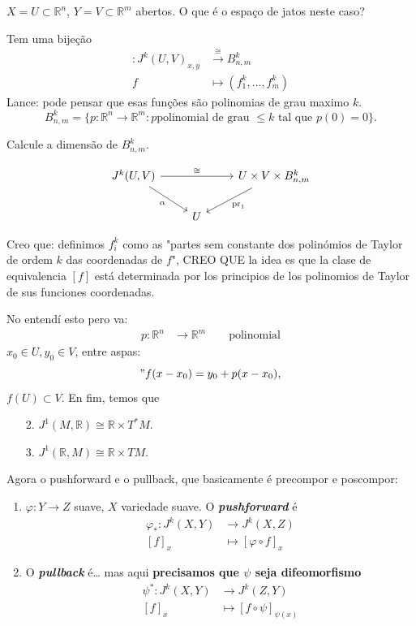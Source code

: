 \begin{example}\leavevmode
\(X=U \subset \mathbb{R}^n\), \(Y= V \subset \mathbb{R}^m\) abertos. O que é o espaço de jatos neste caso?

Tem uma bijeção 
\begin{align*}
	: J^k(U,V)_{x,y} &\xrightarrow{\cong}B_{n,m}^k \\
	f &\longmapsto (f_1^k,\ldots,f_m^k)
\end{align*}
Lance: pode pensar que esas funções são polinomias de grau maximo $k$.
\[B^k_{n,m}=\{p: \mathbb{R}^n\to \mathbb{R}^m: p \text{polinomial de grau \(\leq k\) tal que \(p(0)=0\)} \}.\]

\begin{exercise}\leavevmode
Calcule a dimensão de \(B^k_{n,m}\).
\end{exercise}
\[\begin{tikzcd}
J^k(U,V)\arrow[rr,"\cong"]\arrow[dr,"\alpha",swap]&&U \times V \times B^k_{n,m}\arrow[dl,"\operatorname{pr}_1"]\\
&U
\end{tikzcd}\]


Creo que: definimos \(f^k_i\) como as "partes sem constante dos polinómios de Taylor de ordem $k$ das coordenadas de $f$",
{\color{7}CREO QUE la idea es que la clase de equivalencia \([f]\)  está determinada por los principios de los polinomios de Taylor de sus funciones coordenadas.}

No entendí esto pero va:
\begin{align*}
	p: \mathbb{R}^n &\longrightarrow \mathbb{R}^m \qquad \text{polinomial}
\end{align*}
\(x_0 \in U, y_0 \in V\), entre aspas:
\["f(x-x_0) = y_0+p(x-x_0),\]
\(f(U) \subset V.\)
En fim, temos que
\begin{enumerate}
	\item[2.] \(J^1(M,\mathbb{R}) \cong \mathbb{R} \times T^*M\).
	\item[3.] \(J^1(\mathbb{R},M) \cong \mathbb{R} \times TM.\)
\end{enumerate}
\end{example}
Agora o pushforward e o pullback, que basicamente é precompor e poscompor:
\begin{defn}\leavevmode
\begin{enumerate}
\item \(\varphi:Y \to Z\) suave, \(X \) variedade suave. O \textit{\textbf{pushforward}} é
	\begin{align*}
		\varphi_*: J^k(X,Y) &\longrightarrow J^k(X,Z) \\
		[f]_x &\longmapsto [\varphi \circ f]_x
	\end{align*}
\item O  \textit{\textbf{pullback}} é… mas aqui \textbf{precisamos que  \(\psi\) seja difeomorfismo} 
	\begin{align*}
		\psi^*: J^k(X,Y) &\longrightarrow J^k(Z,Y) \\
		[f]_x &\longmapsto [f \circ \psi]_{\psi(x)}
	\end{align*}
\end{enumerate}
\end{defn}

